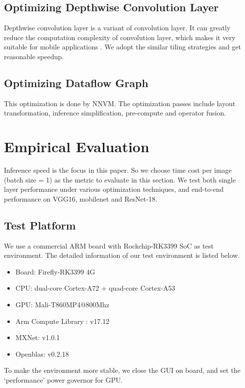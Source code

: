 \documentclass[sigplan]{acmart}
\begin{document}
\subsection {Optimizing Depthwise Convolution Layer}
Depthwise convolution layer is a variant of convolution layer. It can greatly reduce the computation complexity of convolution layer, which makes it very suitable for mobile applications \cite{andrew2017mobilenet}. We adopt the similar tiling strategies and get reasonable speedup.

\subsection{Optimizing Dataflow Graph}
This optimization is done by NNVM. The optimization passes include layout transformation, inference simplification,
pre-compute and operator fusion.

\section{Empirical Evaluation}

Inference speed is the focus in this paper. So we choose time cost per image (batch size = 1) as the metric to evaluate in this section.
We test both single layer performance under various optimization techniques, and end-to-end performance on VGG16, mobilenet and ResNet-18.

\subsection{Test Platform}
We use a commercial ARM board with Rockchip-RK3399 SoC as test environment. 
The detailed information of our test environment is listed below.
\begin{itemize}
\item Board: Firefly-RK3399 4G
\item CPU: dual-core Cortex-A72 + quad-core Cortex-A53
\item GPU: Mali-T860MP4@800Mhz

\item Arm Compute Library : v17.12
\item MXNet: v1.0.1
\item Openblas: v0.2.18
\end{itemize}
To make the environment more stable, we close the GUI on board, and set the `performance' power governor for GPU.
\end{document}
